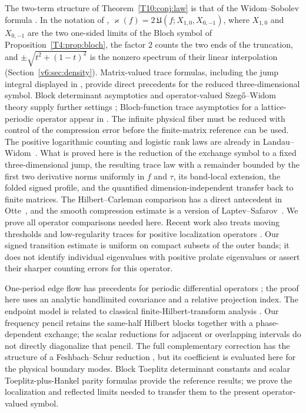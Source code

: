 The two-term structure of Theorem~\ref{T10:conj:law} is that of the
Widom--Sobolev formula \cite{BollmannMueller2024,Sobolev2013,Widom1982}.
In the notation of \cite[eq.~(2.27)]{BollmannMueller2024},
$\varkappa(f)=2\,\mathfrak U(f;X_{1,0},X_{0,-1})$, where $X_{1,0}$ and
$X_{0,-1}$ are the two one-sided limits of the Bloch symbol of
Proposition~\ref{T4:prop:bloch}, the factor $2$ counts the two ends of
the truncation, and $\pm\sqrt{t^2+(1-t)^2}$ is the nonzero spectrum of
their linear interpolation (Section~\ref{v6:sec:density}).  Matrix-valued trace formulas, including the jump integral displayed in
\cite[eq.~(1.3)]{Shao2003}, provide direct precedents for the reduced
three-dimensional symbol. Block determinant asymptotics and
operator-valued Szeg\H{o}--Widom theory supply further settings
\cite{BasorEhrhardtVirtanen2024,BoettcherSilbermann1994};
Bloch-function trace asymptotics for a lattice-periodic operator appear in
\cite{PfirschSobolev2018}. The infinite physical fiber must be reduced
with control of the compression error before the finite-matrix reference
can be used. The positive logarithmic counting and
logistic rank laws are already in
Landau--Widom~\cite[pp.~469--470]{LandauWidom1980}.
What is proved here is the reduction of the exchange symbol to a fixed
three-dimensional jump, the resulting trace law with a remainder bounded
by the first two derivative norms uniformly in $f$ and $\tau$, its
band-local extension, the folded signed profile, and the quantified
dimension-independent transfer back to finite matrices.  The Hilbert--Carleman comparison has a direct antecedent in
Otte~\cite{Otte2024}, and the smooth compression estimate is a version of
Laptev--Safarov~\cite{LaptevSafarov1996}. We prove all operator comparisons
needed here. Recent work also treats moving thresholds and low-regularity traces for
positive localization operators \cite{Azimifard2026b,KulikovDamLarsen2026}.
Our signed transition estimate is uniform on compact subsets of the outer
bands; it does not identify individual eigenvalues with positive prolate
eigenvalues or assert their sharper counting errors for this operator.



One-period edge flow has precedents for periodic differential
operators \cite[Proposition~3.21]{Gontier2020}; the proof here uses
an analytic bandlimited covariance and a relative projection index.
The endpoint model is related to classical finite-Hilbert-transform
analysis \cite{KoppelmanPincus1959,BertolaEtAl2020,AlAifariKatsevich2014}.
Our frequency pencil retains the same-half Hilbert blocks together
with a phase-dependent exchange; the scalar reductions for adjacent
or overlapping intervals do not directly diagonalize that pencil.
The full complementary correction has the structure of a
Feshbach--Schur reduction \cite{DussonSigalStamm2021}, but its
coefficient is evaluated here for the physical boundary modes.
Block Toeplitz determinant constants
\cite{BasorEhrhardtVirtanen2024} and scalar
Toeplitz-plus-Hankel parity formulas \cite{BasorEhrhardt2002}
provide the reference results; we prove the localization and reflected
limits needed to transfer them to the present operator-valued symbol.



